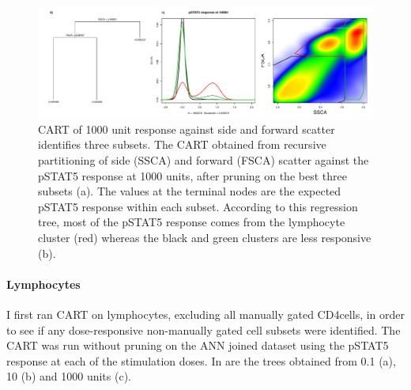 \begin{figure}[!h]
\centering
\includegraphics[scale=.5]{figures/pstat5-response-decision-tree}
{ CART of 1000 unit response against side and forward scatter identifies three subsets. }
{
The \gls{CART} obtained from recursive partitioning of side (SSCA) and forward (FSCA) scatter against the pSTAT5 response at 1000 units,
after pruning on the best three subsets (a).
The values at the terminal nodes are the expected pSTAT5 response within each subset.
According to this regression tree, most of the pSTAT5 response comes from the lymphocyte cluster (red) whereas
the black and green clusters are less responsive (b).
} 
\end{figure}

\paragraph{Lymphocytes} 
I first ran CART on lymphocytes, excluding all manually gated CD4\positive cells, in order to see if any dose-responsive
non-manually gated cell subsets were identified.
The CART was run without pruning on the ANN joined dataset using the pSTAT5 response at each of the stimulation doses.
In  are the trees obtained from 0.1 (a), 10 (b)
and 1000 units (c).

